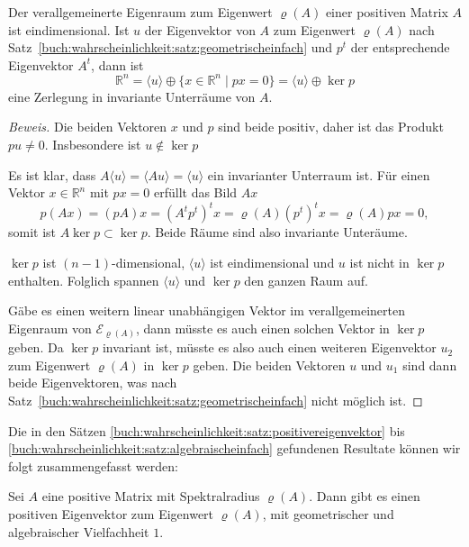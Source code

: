 \begin{satz}
\label{buch:wahrscheinlichkeit:satz:algebraischeinfach}
Der verallgemeinerte Eigenraum zum Eigenwert $\varrho(A)$ einer 
positiven Matrix $A$ ist eindimensional.
Ist $u$ der Eigenvektor von $A$ zum Eigenwert $\varrho(A)$ nach
Satz~\ref{buch:wahrscheinlichkeit:satz:geometrischeinfach}
und $p^t$ der entsprechende Eigenvektor $A^t$, dann
ist
\[
\mathbb{R}^n
=
\langle u\rangle
\oplus
\{ x\in\mathbb{R}^n\;|\; px=0\}
=
\langle u\rangle
\oplus
\ker p
\]
eine Zerlegung in invariante Unterräume von $A$.
\end{satz}

\begin{proof}[Beweis]
Die beiden Vektoren $x$ und $p$ sind beide positiv, daher ist das 
Produkt $pu\ne 0$.
Insbesondere ist $u\not\in\ker p$

Es ist klar, dass $A\langle u\rangle = \langle Au\rangle = \langle u\rangle$
ein invarianter Unterraum ist.
Für einen Vektor $x\in\mathbb{R}^n$ mit $px=0$ erfüllt das Bild $Ax$
\[
p(Ax)=(pA)x=(A^tp^t)^tx=
\varrho(A)(p^t)^tx
=
\varrho(A)px = 0,
\]
somit ist $A\ker p \subset \ker p$.
Beide Räume sind also invariante Unteräume.

$\ker p$ ist $(n-1)$-dimensional, $\langle u\rangle$ ist eindimensional
und $u$ ist nicht in $\ker p$ enthalten.
Folglich spannen $\langle u\rangle$ und $\ker p$ den ganzen Raum auf.

Gäbe es einen weitern linear unabhängigen Vektor im verallgemeinerten
Eigenraum von $\mathcal{E}_{\varrho(A)}$, dann müsste es auch einen
solchen Vektor in $\ker p$ geben.
Da $\ker p$ invariant ist, müsste es also auch einen weiteren Eigenvektor
$u_2$ zum Eigenwert $\varrho(A)$ in $\ker p$ geben.
Die beiden Vektoren $u$ und $u_1$ sind dann beide Eigenvektoren, was
nach Satz~\ref{buch:wahrscheinlichkeit:satz:geometrischeinfach}
nicht möglich ist.
\end{proof}

Die in den Sätzen
\ref{buch:wahrscheinlichkeit:satz:positivereigenvektor}
bis
\ref{buch:wahrscheinlichkeit:satz:algebraischeinfach}
gefundenen Resultate können wir folgt zusammengefasst werden:

\begin{satz}
\label{buch:wahrscheinlichkeit:satz:perron-frobenius}
Sei $A$ eine positive Matrix mit Spektralradius $\varrho(A)$.
Dann gibt es einen positiven Eigenvektor zum Eigenwert $\varrho(A)$,
mit geometrischer und algebraischer Vielfachheit $1$.
\end{satz}


